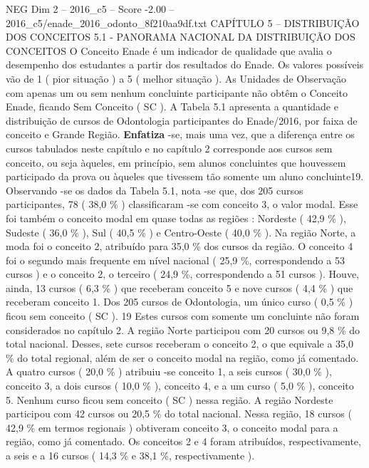 \begin{textsample}{NEG Dim 2 – 2016\_c5 – Score -2.00 – 2016\_c5/enade\_2016\_odonto\_8f210aa9df.txt}  \label{ex:f2_neg_037}
CAPÍTULO 5 – DISTRIBUIÇÃO DOS CONCEITOS 5.1 - PANORAMA NACIONAL DA DISTRIBUIÇÃO DOS CONCEITOS O Conceito Enade é um indicador de qualidade que avalia o desempenho dos estudantes a partir dos resultados do Enade.
Os valores possíveis vão de 1 ( pior situação ) a 5 ( melhor situação ).
As Unidades de Observação com apenas um ou sem nenhum concluinte participante não obtêm o Conceito Enade, ficando Sem Conceito ( SC ).
A Tabela 5.1 apresenta a quantidade e distribuição de cursos de Odontologia participantes do Enade/2016, por faixa de conceito e Grande Região. \textbf{Enfatiza} -se, mais uma vez, que a diferença entre os cursos tabulados neste capítulo e no capítulo 2 corresponde aos cursos sem conceito, ou seja àqueles, em princípio, sem alunos concluintes que houvessem participado da prova ou àqueles que tivessem tão somente um aluno concluinte19.
Observando -se os dados da Tabela 5.1, nota -se que, dos 205 cursos participantes, 78 ( 38,0 \% ) classificaram -se com conceito 3, o valor modal.
Esse foi também o conceito modal em quase todas as regiões : Nordeste ( 42,9 \% ), Sudeste ( 36,0 \% ), Sul ( 40,5 \% ) e Centro-Oeste ( 40,0 \% ).
Na região Norte, a moda foi o conceito 2, atribuído para 35,0 \% dos cursos da região.
O conceito 4 foi o segundo mais frequente em nível nacional ( 25,9 \%, correspondendo a 53 cursos ) e o conceito 2, o terceiro ( 24,9 \%, correspondendo a 51 cursos ).
Houve, ainda, 13 cursos ( 6,3 \% ) que receberam conceito 5 e nove cursos ( 4,4 \% ) que receberam conceito 1.
Dos 205 cursos de Odontologia, um único curso ( 0,5 \% ) ficou sem conceito ( SC ). 19 Estes cursos com somente um concluinte não foram considerados no capítulo 2.
A região Norte participou com 20 cursos ou 9,8 \% do total nacional.
Desses, sete cursos receberam o conceito 2, o que equivale a 35,0 \% do total regional, além de ser o conceito modal na região, como já comentado.
A quatro cursos ( 20,0 \% ) atribuiu -se conceito 1, a seis cursos ( 30,0 \% ), conceito 3, a dois cursos ( 10,0 \% ), conceito 4, e a um curso ( 5,0 \% ), conceito 5.
Nenhum curso ficou sem conceito ( SC ) nessa região.
A região Nordeste participou com 42 cursos ou 20,5 \% do total nacional.
Nessa região, 18 cursos ( 42,9 \% em termos regionais ) obtiveram conceito 3, o conceito modal para a região, como já comentado.
Os conceitos 2 e 4 foram atribuídos, respectivamente, a seis e a 16 cursos ( 14,3 \% e 38,1 \%, respectivamente ).

\end{textsample}
